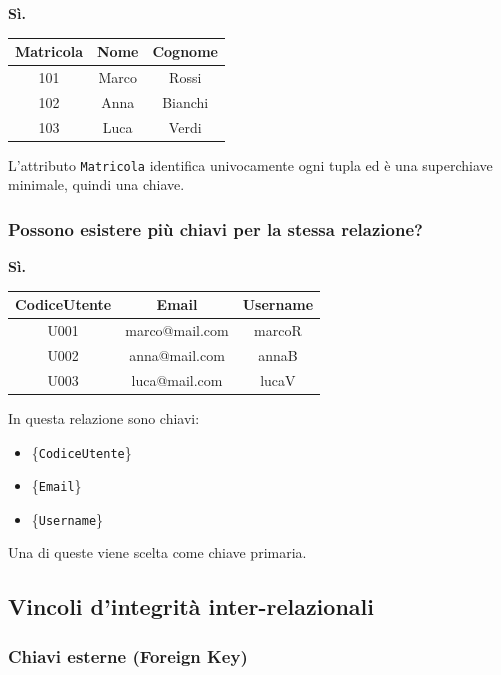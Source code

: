 \documentclass[a4paper,12pt]{article}
\begin{document}
\textbf{Sì.}

\begin{center}
\begin{tabular}{|c|c|c|}
\hline
\textbf{Matricola} & \textbf{Nome} & \textbf{Cognome} \\
\hline
101 & Marco & Rossi \\
102 & Anna & Bianchi \\
103 & Luca & Verdi \\
\hline
\end{tabular}
\end{center}

L’attributo \texttt{Matricola} identifica univocamente ogni tupla ed è una superchiave minimale, quindi una chiave.

\bigskip

\subsubsection*{Possono esistere più chiavi per la stessa relazione?}

\textbf{Sì.}

\begin{center}
\begin{tabular}{|c|c|c|}
\hline
\textbf{CodiceUtente} & \textbf{Email} & \textbf{Username} \\
\hline
U001 & marco@mail.com & marcoR \\
U002 & anna@mail.com & annaB \\
U003 & luca@mail.com & lucaV \\
\hline
\end{tabular}
\end{center}

In questa relazione sono chiavi:
\begin{itemize}
    \item \{\texttt{CodiceUtente}\}
    \item \{\texttt{Email}\}
    \item \{\texttt{Username}\}
\end{itemize}
Una di queste viene scelta come chiave primaria.


\newpage
\subsection{Vincoli d'integrità inter-relazionali}

\subsubsection{Chiavi esterne (Foreign Key)}
\end{document}
